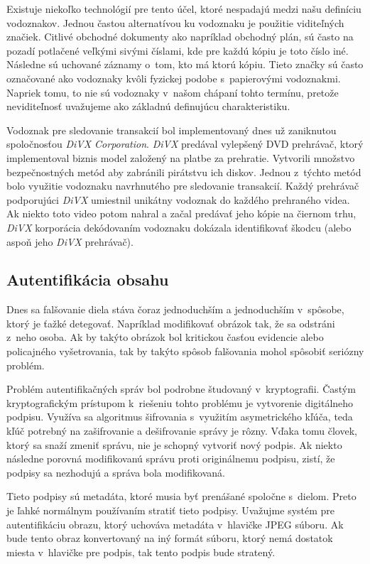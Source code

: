 Existuje niekoľko technológií pre tento účel, ktoré nespadajú medzi našu definíciu vodoznakov. Jednou častou alternatívou ku vodoznaku je použitie viditeľných značiek. Citlivé obchodné dokumenty ako napríklad obchodný plán, sú často na pozadí potlačené veľkými sivými číslami, kde pre každú kópiu je toto číslo iné. Následne sú uchované záznamy o~tom, kto má ktorú kópiu. Tieto značky sú často označované ako vodoznaky kvôli fyzickej podobe s~papierovými vodoznakmi. Napriek tomu, to nie sú vodoznaky v~našom chápaní tohto termínu, pretože neviditeľnosť uvažujeme ako základnú definujúcu charakteristiku.

Vodoznak pre sledovanie transakcií bol implementovaný dnes už zaniknutou spoločnosťou {\it DiVX Corporation}. {\it DiVX} predával vylepšený DVD prehrávač, ktorý implementoval biznis model založený na platbe za prehratie. Vytvorili množstvo bezpečnostných metód aby zabránili pirátstvu ich diskov. Jednou z~týchto metód bolo využitie vodoznaku navrhnutého pre sledovanie transakcií. Každý prehrávač podporujúci {\it DiVX} umiestnil unikátny vodoznak do každého prehraného videa. Ak niekto toto video potom nahral a začal predávať jeho kópie na čiernom trhu, {\it DiVX} korporácia dekódovaním vodoznaku dokázala identifikovať škodcu (alebo aspoň jeho {\it DiVX} prehrávač). \cite{Cox}

\subsection{Autentifikácia obsahu}
Dnes sa falšovanie diela stáva čoraz jednoduchším a jednoduchším v~spôsobe, ktorý je ťažké detegovať. Napríklad modifikovať obrázok tak, že sa odstráni z~neho osoba. Ak by takýto obrázok bol kritickou časťou evidencie alebo policajného vyšetrovania, tak by takýto spôsob falšovania mohol spôsobiť seriózny problém.

Problém autentifikačných správ bol podrobne študovaný v~kryptografii. Častým kryptografickým prístupom k~riešeniu tohto problému je vytvorenie digitálneho podpisu. Využíva sa algoritmus šifrovania s~využitím asymetrického kľúča, teda kľúč potrebný na zašifrovanie a dešifrovanie správy je rôzny. Vďaka tomu človek, ktorý sa snaží zmeniť správu, nie je schopný vytvoriť nový podpis. Ak niekto následne porovná modifikovanú správu proti originálnemu podpisu, zistí, že podpisy sa nezhodujú a správa bola modifikovaná.

Tieto podpisy sú metadáta, ktoré musia byť prenášané spoločne s~dielom. Preto je ľahké normálnym používaním stratiť tieto podpisy. Uvažujme systém pre autentifikáciu obrazu, ktorý uchováva metadáta v~hlavičke JPEG súboru. Ak bude tento obraz konvertovaný na iný formát súboru, ktorý nemá dostatok miesta v~hlavičke pre podpis, tak tento podpis bude stratený.

